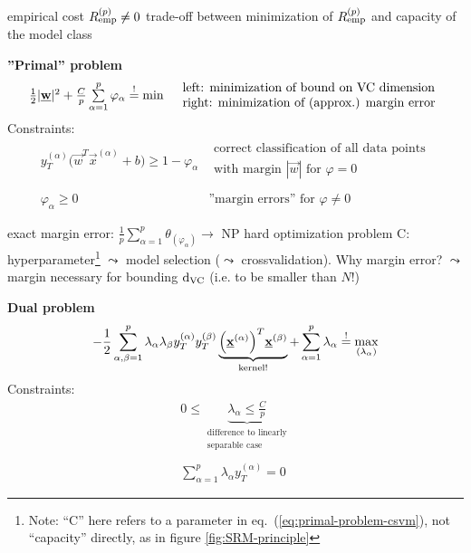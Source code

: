 \begin{itemize}
	\itR empirical cost $R_{\operatorname{emp}}^{(p)} \neq 0$
	\itR trade-off between minimization of $R_{\operatorname{emp}}^{(p)}$ and capacity of 
		the model class
\end{itemize}
{\bf ''Primal'' problem}
\begin{equation}\label{eq:primal-problem-csvm}
	\begin{array}{ll}
	\frac{1}{2} |\underline{\mathbf{w}}|^2 + \frac{C}{p} \sum\limits_{\alpha = 1}^p 
		\varphi_\alpha \stackrel{\mathrm{!}}{=} \min 
	& \begin{array}{l}
		\text{left: minimization of bound on VC dimension} \\
		\text{right: minimization of (approx.) margin error}
	\end{array}
	\end{array}
\end{equation}
Constraints:
\begin{equation}
	\begin{array}{ll}
		y_T^{(\alpha)} \Big( \vec{w}^T \vec{x}^{(\alpha)} + b \Big)
			\geq 1 - \varphi_\alpha
		& \substack{ \text{correct classification of all data points} \\
				\text{with margin } |\vec{w}| \text{ for } 
				\varphi = 0 } \\\\
		\varphi_\alpha \geq 0 
		& \text{''margin errors'' for } \varphi \neq 0
	\end{array}
\end{equation}
\begin{itemize}
	\itR exact margin error: $\frac{1}{p} \sum\limits_{\alpha = 1}^p 
		\theta_{(\varphi_\alpha)} \rightarrow$ NP hard optimization 
		problem
	\itR C: hyperparameter\footnote{Note: ``C'' here refers to a parameter in eq.~(\ref{eq:primal-problem-csvm}), not ``capacity'' directly, as in figure \ref{fig:SRM-principle}} $\leadsto$ model selection ($\leadsto$ crossvalidation).
	\itR Why margin error? $\leadsto$ margin necessary for bounding $\mathrm{d}_{\mathrm{VC}}$
		(i.e. to be smaller than $N$!)
\end{itemize}
{\bf Dual problem}
\begin{equation}
	-\frac{1}{2} \sum\limits_{\alpha,\beta = 1}^p \lambda_\alpha
		\lambda_\beta y_T^{(\alpha)} y_T^{(\beta)} 
		\underbrace{ \Big( \underline{\mathbf{x}}^{(\alpha)} \Big)^T 
			\underline{\mathbf{x}}^{(\beta)}}_{\text{kernel!}}
		+ \sum\limits_{\alpha = 1}^p \lambda_\alpha 
		\stackrel{\mathrm{!}}{=} \max_{(\lambda_\alpha)}
\end{equation}
Constraints:
\begin{equation}
	\begin{array}{l}
	0 \leq \underbrace{\lambda_\alpha \leq \frac{C}{p} }_{
		\substack{ \text{difference to linearly} \\
			\text{separable case}}} \\\\
	\sum\limits_{\alpha = 1}^p \lambda_\alpha y_T^{(\alpha)} = 0
	\end{array}
\end{equation}
